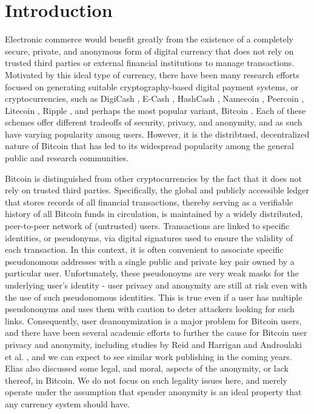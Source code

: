 \section{Introduction}

Electronic commerce would benefit greatly from the existence of a completely secure, private, and anonymous form of digital currency that does not rely on trusted third parties or external financial institutions to manage transactions. Motivated by this ideal type of currency, there have been many research efforts focused on generating suitable cryptography-based digital payment systems, or cryptocurrencies, such as DigiCash \cite{digicash}, E-Cash \cite{ecash}, HashCash \cite{hashcash}, Namecoin \cite{namecoin}, Peercoin \cite{peercoin}, Litecoin \cite{litecoin}, Ripple \cite{ripple}, and perhaps the most popular variant, Bitcoin \cite{bitcoin}. Each of these schemes offer different tradeoffs of security, privacy, and anonymity, and as such have varying popularity among users. However, it is the distribtued, decentralized nature of Bitcoin that has led to its widespread popularity among the general public and research communities. 

Bitcoin is distinguished from other cryptocurrencies by the fact that it does not rely on trusted third parties. Specifically, the global and publicly accessible ledger that stores records of all financial transactions, thereby serving as a verifiable history of all Bitcoin funds in circulation, is maintained by a widely distributed, peer-to-peer network of (untrusted) users. Transactions are linked to specific identities, or pseudonyms, via digital signatures used to ensure the validity of each transaction. In this context, it is often convenient to associate specific pseudonomous addresses with a single public and private key pair owned by a particular user. Unfortunately, these pseudonoyms are very weak masks for the underlying user's identity - user privacy and anonymity are still at risk even with the use of such pseudonomous identities. This is true even if a user has multiple pseudononyms and uses them with caution to deter attackers looking for such links. Consequently, user deanonymization is a major problem for Bitcoin users, and there have been several academic efforts to further the cause for Bitcoin user privacy and anonymity, including studies by Reid and Harrigan \cite{ReidHarrigan13} and Androulaki et al. \cite{Androulaki12-privacy}, and we can expect to see similar work publishing in the coming years. Elias \cite{elias} also discussed some legal, and moral, aspects of the anonymity, or lack thereof, in Bitcoin. We do not focus on such legality issues here, and merely operate under the assumption that spender anonymity is an ideal property that any currency system should have.

